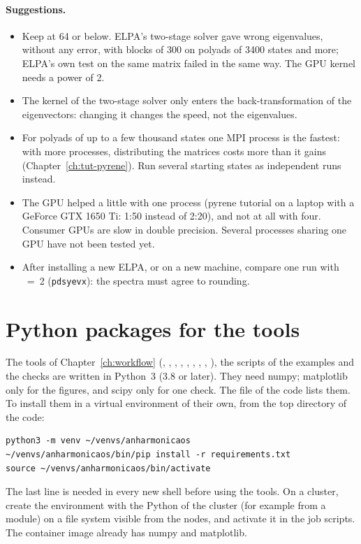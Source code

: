 \paragraph{Suggestions.}
\begin{itemize}
\item Keep  at 64 or below. ELPA's two-stage solver gave
  wrong eigenvalues, without any error, with blocks of 300 on polyads of
  3400 states and more; ELPA's own test on the same matrix failed in the
  same way. The GPU kernel needs a power of 2.
\item The kernel of the two-stage solver only enters the
  back-transformation of the eigenvectors: changing it changes the speed,
  not the eigenvalues.
\item For polyads of up to a few thousand states one MPI process is the
  fastest: with more processes, distributing the matrices costs more than
  it gains (Chapter~\ref{ch:tut-pyrene}). Run several starting states as
  independent runs instead.
\item The GPU helped a little with one process (pyrene tutorial on a
  laptop with a GeForce GTX 1650 Ti: 1:50 instead of 2:20), and not at all
  with four. Consumer GPUs are slow in double precision. Several
  processes sharing one GPU have not been tested yet.
\item After installing a new ELPA, or on a new machine, compare one run
  with ~=~2 (\texttt{pdsyevx}): the spectra must agree
  to rounding.
\end{itemize}

\section{Python packages for the tools}\label{sec:python}

The tools of Chapter~\ref{ch:workflow} (,
, , ,
, , ,
, ), the scripts of the examples and the checks are
written in Python~3 (3.8 or later). They need numpy; matplotlib only for
the figures, and scipy only for one check. The file
 of the code lists them. To install them in a
virtual environment of their own, from the top directory of the code:
\begin{lstlisting}
python3 -m venv ~/venvs/anharmonicaos
~/venvs/anharmonicaos/bin/pip install -r requirements.txt
source ~/venvs/anharmonicaos/bin/activate
\end{lstlisting}
The last line is needed in every new shell before using the tools. On a
cluster, create the environment with the Python of the cluster (for
example from a module) on a file system visible from the nodes, and
activate it in the job scripts. The container image already has numpy and
matplotlib.

